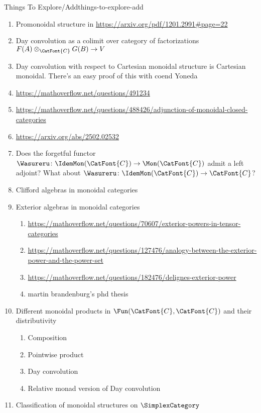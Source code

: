 \begin{remark}{Things To Explore/Add}{things-to-explore-add}
\begin{enumerate}
        \item Promonoidal structure in \url{https://arxiv.org/pdf/1201.2991#page=22}
        \item Day convolution as a colimit over category of factorizations $F(A)\otimes_{\CatFont{C}}G(B)\to V$
        \item Day convolution with respect to Cartesian monoidal structure is Cartesian monoidal. There's an easy proof of this with coend Yoneda
        \item \url{https://mathoverflow.net/questions/491234}
        \item \url{https://mathoverflow.net/questions/488426/adjunction-of-monoidal-closed-categories}
        \item \url{https://arxiv.org/abs/2502.02532}
        \item Does the forgetful functor $\Wasureru\colon\IdemMon(\CatFont{C})\to\Mon(\CatFont{C})$ admit a left adjoint? What about $\Wasureru\colon\IdemMon(\CatFont{C})\to\CatFont{C}$?
        \item Clifford algebras in monoidal categories
        \item Exterior algebras in monoidal categories
            \begin{enumerate}
                \item \url{https://mathoverflow.net/questions/70607/exterior-powers-in-tensor-categories}
                \item \url{https://mathoverflow.net/questions/127476/analogy-between-the-exterior-power-and-the-power-set}
                \item \url{https://mathoverflow.net/questions/182476/delignes-exterior-power}
                \item martin brandenburg's phd thesis
            \end{enumerate}
        \item Different monoidal products in $\Fun(\CatFont{C},\CatFont{C})$ and their distributivity
            \begin{enumerate}
                \item Composition
                \item Pointwise product
                \item Day convolution
                \item Relative monad version of Day convolution
            \end{enumerate}
        \item Classification of monoidal structures on $\SimplexCategory$

\end{enumerate}
\end{remark}
